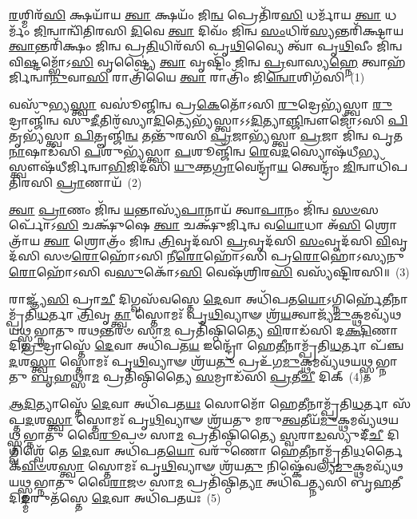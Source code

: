 \setcounter{anuvakam}{0}
\-\ul{𑌰}\-𑌶𑍍𑌮𑌿𑌰᳴\-\ul{𑌸𑌿} 𑌕𑍍𑌷𑌯𑌾᳴𑌯 \ul{𑌤𑍍𑌵𑌾} 𑌕𑍍𑌷𑌯𑌂᳴ 𑌜𑌿\-\ul{𑌨𑍍𑌵} 𑌪𑍍𑌰𑍇𑌤𑌿᳴𑌰\-\ul{𑌸𑌿} 𑌧𑌰𑍍𑌮𑌾᳴𑌯 \ul{𑌤𑍍𑌵𑌾} 𑌧𑌰𑍍𑌮𑌂᳴ \ul{𑌜𑌿}\-𑌨𑍍𑌵𑌾𑌨𑍍𑌵𑌿᳴𑌤𑌿𑌰𑌸𑌿 \ul{𑌦𑌿}\-𑌵𑍇 \ul{𑌤𑍍𑌵𑌾} 𑌦𑌿𑌵𑌂᳴ 𑌜𑌿𑌨𑍍𑌵 \ul{𑌸𑌂}\-𑌧𑌿𑌰᳴\-\ul{𑌸𑍍𑌯}\-𑌨𑍍𑌤𑌰𑌿᳴𑌕𑍍𑌷𑌾𑌯 \ul{𑌤𑍍𑌵𑌾}\-𑌨𑍍𑌤𑌰𑌿᳴𑌕𑍍𑌷𑌂 𑌜𑌿𑌨𑍍𑌵 𑌪𑍍𑌰\-\ul{𑌤𑌿}\-𑌧𑌿𑌰᳴𑌸𑌿 𑌪𑍃\-\ul{𑌥𑌿}\-𑌵𑍍𑌯𑍈 𑌤𑍍𑌵𑌾᳴ 𑌪𑍃\-\ul{𑌥𑌿}\-𑌵𑍀𑌂 𑌜𑌿᳴𑌨𑍍𑌵 𑌵𑌿\-\ul{𑌷𑍍𑌟}\-𑌮𑍍𑌭𑍋᳴\-𑌽\-\ul{𑌸𑌿} 𑌵𑍃𑌷𑍍𑌟𑍍𑌯𑍈॑ \ul{𑌤𑍍𑌵𑌾} 𑌵𑍃𑌷𑍍𑌟𑌿𑌂᳴ 𑌜𑌿𑌨𑍍𑌵 \ul{𑌪𑍍𑌰}\-𑌵𑌾𑌸𑍍𑌯\-\ul{𑌹𑍍𑌨𑍇} 𑌤𑍍𑌵𑌾𑌹᳴𑌰𑍍𑌜𑌿𑌨𑍍𑌵𑌾\-\ul{𑌨𑍁}\-𑌵𑌾\-\ul{𑌸𑌿} 𑌰𑌾𑌤𑍍𑌰𑌿᳴𑌯𑍈 \ul{𑌤𑍍𑌵𑌾} 𑌰𑌾𑌤𑍍𑌰𑌿𑌂᳴ 𑌜𑌿\-\ul{𑌨𑍍𑌵𑍋}\-𑌶𑌿𑌗᳴𑌸𑌿~(1)

𑌵𑌸𑍁᳴𑌭𑍍𑌯\-\ul{𑌸𑍍𑌤𑍍𑌵𑌾} 𑌵𑌸𑍂॑𑌞𑍍𑌜𑌿𑌨𑍍𑌵 𑌪𑍍𑌰\-\ul{𑌕𑍇}\-𑌤𑍋᳴\-𑌽𑌸𑌿 \ul{𑌰𑍁}\-𑌦𑍍𑌰𑍇𑌭𑍍𑌯᳴𑌸𑍍𑌤𑍍𑌵𑌾 \ul{𑌰𑍁}\-𑌦𑍍𑌰𑌾𑌞𑍍𑌜𑌿᳴𑌨𑍍𑌵 𑌸𑍁\-\ul{𑌦𑍀}\-𑌤𑌿𑌰᳴𑌸𑍍𑌯𑌾\-\ul{𑌦𑌿}\-𑌤𑍍𑌯𑍇𑌭𑍍𑌯᳴𑌸𑍍𑌤𑍍𑌵𑌾\-𑌽\-𑌽\-\ul{𑌦𑌿}\-𑌤𑍍𑌯𑌾\-\ul{𑌞𑍍𑌜𑌿}\-𑌨𑍍𑌵𑍗𑌜𑍋᳴\-𑌽𑌸𑌿 \ul{𑌪𑌿}\-𑌤𑍃𑌭𑍍𑌯᳴𑌸𑍍𑌤𑍍𑌵𑌾 \ul{𑌪𑌿}\-𑌤𑍄𑌞𑍍𑌜𑌿᳴\-\ul{𑌨𑍍𑌵} 𑌤𑌨𑍍𑌤𑍁᳴𑌰𑌸𑌿 \ul{𑌪𑍍𑌰}\-𑌜𑌾𑌭𑍍𑌯᳴𑌸𑍍𑌤𑍍𑌵𑌾 \ul{𑌪𑍍𑌰}\-𑌜𑌾 𑌜𑌿᳴𑌨𑍍𑌵 𑌪𑍃𑌤\-\ul{𑌨𑌾}\-𑌷𑌾𑌡᳴𑌸𑌿 \ul{𑌪}\-𑌶𑍁𑌭𑍍𑌯᳴𑌸𑍍𑌤𑍍𑌵𑌾 \ul{𑌪}\-𑌶𑍂𑌞𑍍𑌜𑌿᳴𑌨𑍍𑌵 \ul{𑌰𑍇}\-𑌵\-\ul{𑌦}\-𑌸𑍍𑌯𑍋𑌷᳴𑌧𑍀\-\ul{𑌭𑍍𑌯}\-𑌸𑍍𑌤𑍍𑌵𑍗𑌷᳴𑌧𑍀𑌰𑍍𑌜𑌿𑌨𑍍𑌵𑌾\-\ul{𑌭𑌿}\-𑌜𑌿𑌦᳴𑌸𑌿 \ul{𑌯𑍁}\-𑌕𑍍𑌤\-\ul{𑌗𑍍𑌰𑌾}\-𑌵𑍇𑌨𑍍𑌦𑍍𑌰𑌾᳴\-\ul{𑌯} 𑌤𑍍𑌵𑍇𑌨𑍍𑌦𑍍𑌰𑌂᳴ \ul{𑌜𑌿}\-𑌨𑍍𑌵𑌾𑌧𑌿᳴𑌪𑌤𑌿𑌰𑌸𑌿 \ul{𑌪𑍍𑌰𑌾}\-𑌣𑌾𑌯᳴~(2)

\-\ul{𑌤𑍍𑌵𑌾} \ul{𑌪𑍍𑌰𑌾}\-𑌣𑌂 𑌜𑌿᳴𑌨𑍍𑌵 \ul{𑌯}\-𑌨𑍍𑌤𑌾𑌸𑍍𑌯᳴\-\ul{𑌪𑌾}\-𑌨𑌾𑌯᳴ 𑌤𑍍𑌵𑌾\-\ul{𑌪𑌾}\-𑌨𑌂 𑌜𑌿᳴𑌨𑍍𑌵 \ul{𑌸}\-\-\ul{𑍞}\-𑌸𑌰𑍍𑌪𑍋᳴\-𑌽\-\ul{𑌸𑌿} 𑌚𑌕𑍍𑌷𑍁᳴𑌷𑍇 \ul{𑌤𑍍𑌵𑌾} 𑌚𑌕𑍍𑌷𑍁᳴𑌰𑍍𑌜𑌿𑌨𑍍𑌵 𑌵\-\ul{𑌯𑍋}\-𑌧𑌾 𑌅᳴\-\ul{𑌸𑌿} 𑌶𑍍𑌰𑍋𑌤𑍍𑌰𑌾᳴𑌯 \ul{𑌤𑍍𑌵𑌾} 𑌶𑍍𑌰𑍋𑌤𑍍𑌰𑌂᳴ 𑌜𑌿𑌨𑍍𑌵 \ul{𑌤𑍍𑌰𑌿}\-𑌵𑍃𑌦᳴𑌸𑌿 \ul{𑌪𑍍𑌰}\-𑌵𑍃𑌦᳴𑌸𑌿 \ul{𑌸𑌂}\-𑌵𑍃𑌦᳴𑌸𑌿 \ul{𑌵𑌿}\-𑌵𑍃𑌦᳴𑌸𑌿 𑌸𑍞\-\ul{𑌰𑍋}\-𑌹𑍋᳴\-𑌽𑌸𑌿 𑌨𑍀\-\ul{𑌰𑍋}\-𑌹𑍋᳴\-𑌽𑌸𑌿 𑌪𑍍𑌰\-\ul{𑌰𑍋}\-𑌹𑍋॑\-𑌽𑌸𑍍𑌯𑌨𑍁\-\ul{𑌰𑍋}\-𑌹𑍋᳴\-𑌽𑌸𑌿 𑌵\-\ul{𑌸𑍁}\-𑌕𑍋᳴\-𑌽\-\ul{𑌸𑌿} 𑌵𑍇𑌷᳴𑌶𑍍𑌰𑌿𑌰\-\ul{𑌸𑌿} 𑌵𑌸𑍍𑌯᳴𑌷𑍍𑌟𑌿𑌰𑌸𑌿॥~(3)

{\anuvakamend[{\-\ul{𑌉}\-𑌶𑌿𑌗᳴𑌸𑌿 \ul{𑌪𑍍𑌰𑌾}\-𑌣𑌾\-\ul{𑌯} 𑌤𑍍𑌰𑌿𑌚᳴𑌤𑍍𑌵𑌾𑌰𑌿𑍞𑌶𑌚𑍍𑌚}]}%

𑌰𑌾𑌜𑍍𑌞𑍍𑌯᳴\-\ul{𑌸𑌿} 𑌪𑍍𑌰𑌾\-\ul{𑌚𑍀} 𑌦𑌿𑌗𑍍𑌵𑌸᳴𑌵𑌸𑍍𑌤𑍇 \ul{𑌦𑍇}\-𑌵𑌾 𑌅𑌧𑌿᳴𑌪𑌤\-\ul{𑌯𑍋}\-\-𑌽𑌗𑍍𑌨𑌿𑌰𑍍\mbox{}𑌹𑍇᳴\-\ul{𑌤𑍀}\-𑌨𑌾𑌮𑍍𑌪𑍍𑌰᳴𑌤𑌿\-\ul{𑌧}\-𑌰𑍍𑌤𑌾 \ul{𑌤𑍍𑌰𑌿}\-𑌵𑍃\-\ul{𑌤𑍍𑌤𑍍𑌵𑌾} 𑌸𑍍𑌤𑍋𑌮𑌃᳴ 𑌪𑍃\-\ul{𑌥𑌿}\-𑌵𑍍𑌯𑌾𑍟 𑌶𑍍𑌰᳴\-\ul{𑌯}\-𑌤𑍍𑌵𑌾𑌜𑍍𑌯᳴\-\ul{𑌮𑍁}\-𑌕𑍍𑌥\-𑌮𑌵𑍍𑌯᳴𑌥𑌯𑌥𑍍𑌸𑍍𑌤𑌭𑍍𑌨𑌾𑌤𑍁 𑌰𑌥\-\ul{𑌨𑍍𑌤}\-𑌰𑍞 𑌸𑌾\-\ul{𑌮} 𑌪𑍍𑌰𑌤𑌿᳴𑌷𑍍𑌠𑌿𑌤𑍍𑌯𑍈 \ul{𑌵𑌿}\-𑌰𑌾𑌡᳴𑌸𑌿 𑌦\-\ul{𑌕𑍍𑌷𑌿}\-𑌣𑌾 𑌦𑌿\-\ul{𑌗𑍍𑌰𑍁}\-𑌦𑍍𑌰𑌾𑌸𑍍𑌤𑍇᳴ \ul{𑌦𑍇}\-𑌵𑌾 𑌅𑌧𑌿᳴𑌪𑌤\-\ul{𑌯} 𑌇𑌨𑍍𑌦𑍍𑌰𑍋᳴ 𑌹𑍇\-\ul{𑌤𑍀}\-𑌨𑌾𑌮𑍍𑌪𑍍𑌰᳴𑌤𑌿\-\ul{𑌧}\-𑌰𑍍𑌤𑌾 𑌪᳴𑌞𑍍𑌚\-\ul{𑌦}\-𑌶\-\ul{𑌸𑍍𑌤𑍍𑌵𑌾} 𑌸𑍍𑌤𑍋𑌮𑌃᳴ 𑌪𑍃\-\ul{𑌥𑌿}\-𑌵𑍍𑌯𑌾𑍟 𑌶𑍍𑌰᳴𑌯\-\ul{𑌤𑍁} 𑌪𑍍𑌰𑌉᳴𑌗\-\ul{𑌮𑍁}\-𑌕𑍍𑌥𑌮𑌵𑍍𑌯᳴𑌥𑌯𑌥𑍍𑌸𑍍𑌤𑌭𑍍𑌨𑌾𑌤𑍁 \ul{𑌬𑍃}\-𑌹𑌥𑍍𑌸𑌾\-\ul{𑌮} 𑌪𑍍𑌰𑌤𑌿᳴𑌷𑍍𑌠𑌿𑌤𑍍𑌯𑍈 \ul{𑌸}\-𑌮𑍍𑌰𑌾𑌡᳴𑌸𑌿 \ul{𑌪𑍍𑌰}\-𑌤𑍀\-\ul{𑌚𑍀} 𑌦𑌿𑌕𑍍~(4)

\-\ul{𑌆}\-\-\ul{𑌦𑌿}\-𑌤𑍍𑌯𑌾𑌸𑍍𑌤𑍇᳴ \ul{𑌦𑍇}\-𑌵𑌾 𑌅𑌧𑌿᳴𑌪𑌤\-\ul{𑌯𑌃} 𑌸𑍋𑌮𑍋᳴ 𑌹𑍇\-\ul{𑌤𑍀}\-𑌨𑌾𑌮𑍍𑌪𑍍𑌰᳴𑌤𑌿\-\ul{𑌧}\-𑌰𑍍𑌤𑌾 𑌸᳴𑌪𑍍𑌤\-\ul{𑌦}\-𑌶\-\ul{𑌸𑍍𑌤𑍍𑌵𑌾} 𑌸𑍍𑌤𑍋𑌮𑌃᳴ 𑌪𑍃\-\ul{𑌥𑌿}\-𑌵𑍍𑌯𑌾𑍟 𑌶𑍍𑌰᳴𑌯𑌤𑍁 𑌮𑌰𑍁\-\ul{𑌤𑍍𑌵}\-𑌤𑍀𑌯᳴\-\ul{𑌮𑍁}\-𑌕𑍍𑌥\-𑌮𑌵𑍍𑌯᳴𑌥𑌯𑌥𑍍𑌸𑍍𑌤𑌭𑍍𑌨𑌾𑌤𑍁 𑌵𑍈\-\ul{𑌰𑍂}\-𑌪𑍞 𑌸𑌾\-\ul{𑌮} 𑌪𑍍𑌰𑌤𑌿᳴𑌷𑍍𑌠𑌿𑌤𑍍𑌯𑍈 \ul{𑌸𑍍𑌵}\-𑌰𑌾\-\ul{𑌡}\-𑌸𑍍𑌯𑍁𑌦𑍀᳴\-\ul{𑌚𑍀} 𑌦𑌿𑌗𑍍𑌵𑌿𑌶𑍍𑌵𑍇᳴ 𑌤𑍇 \ul{𑌦𑍇}\-𑌵𑌾 𑌅𑌧𑌿᳴𑌪𑌤\-\ul{𑌯𑍋} 𑌵𑌰𑍁᳴𑌣𑍋 𑌹𑍇\-\ul{𑌤𑍀}\-𑌨𑌾𑌮𑍍𑌪𑍍𑌰᳴𑌤𑌿\-\ul{𑌧}\-𑌰𑍍𑌤𑍈𑌕᳴\-\-\ul{𑌵𑌿}\-\-\ul{𑍞}\-𑌶\-\ul{𑌸𑍍𑌤𑍍𑌵𑌾} 𑌸𑍍𑌤𑍋𑌮𑌃᳴ 𑌪𑍃\-\ul{𑌥𑌿}\-𑌵𑍍𑌯𑌾𑍟 𑌶𑍍𑌰᳴𑌯\-\ul{𑌤𑍁} 𑌨𑌿𑌷𑍍𑌕𑍇᳴𑌵𑌲𑍍𑌯\-\ul{𑌮𑍁}\-𑌕𑍍𑌥𑌮𑌵𑍍𑌯᳴𑌥𑌯𑌥𑍍𑌸𑍍𑌤𑌭𑍍𑌨𑌾𑌤𑍁 𑌵𑍈\-\ul{𑌰𑌾}\-𑌜𑍞 𑌸𑌾\-\ul{𑌮} 𑌪𑍍𑌰𑌤𑌿᳴𑌷𑍍𑌠𑌿\-\ul{𑌤𑍍𑌯𑌾} 𑌅𑌧𑌿᳴𑌪𑌤𑍍𑌨𑍍𑌯𑌸𑌿 𑌬𑍃\-\ul{𑌹}\-𑌤𑍀 𑌦𑌿\-\ul{𑌙𑍍𑌮}\-𑌰𑍁𑌤᳴𑌸𑍍𑌤𑍇 \ul{𑌦𑍇}\-𑌵𑌾 𑌅𑌧𑌿᳴𑌪𑌤𑌯𑌃~(5)

